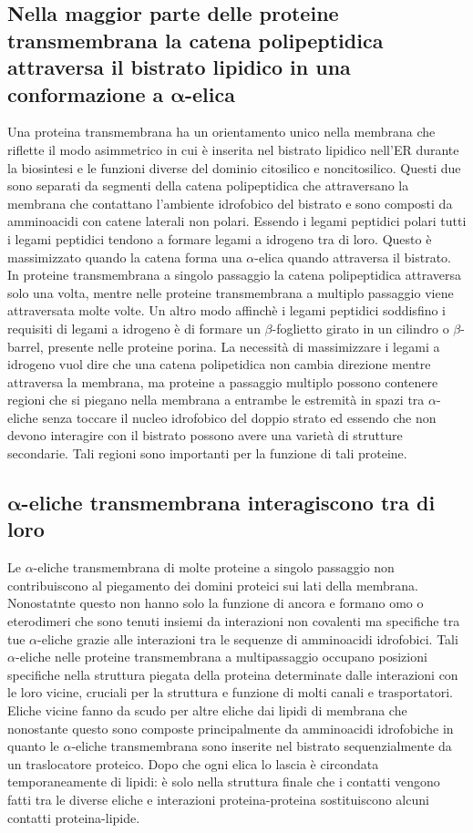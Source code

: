 \subsection{Nella maggior parte delle proteine transmembrana la catena polipeptidica attraversa il bistrato lipidico in una conformazione a $\mathbf{\alpha}$-elica}
Una proteina transmembrana ha un orientamento unico nella membrana che riflette il modo asimmetrico in cui \`e inserita nel bistrato lipidico nell'ER durante la biosintesi e le 
funzioni diverse del dominio citosilico e noncitosilico. Questi due sono separati da segmenti della catena polipeptidica che attraversano la membrana che contattano l'ambiente 
idrofobico del bistrato e sono composti da amminoacidi con catene laterali non polari. Essendo i legami peptidici polari tutti i legami peptidici tendono a formare legami a idrogeno tra
di loro. Questo \`e massimizzato quando la catena forma una $\alpha$-elica quando attraversa il bistrato. In proteine transmembrana a singolo passaggio la catena polipeptidica attraversa
solo una volta, mentre nelle proteine transmembrana a multiplo passaggio viene attraversata molte volte. Un altro modo affinch\`e i legami peptidici soddisfino i requisiti di 
legami a idrogeno \`e di formare un $\beta$-foglietto girato in un cilindro o $\beta$-barrel, presente nelle proteine porina. La necessit\`a di massimizzare i legami a idrogeno vuol dire
che una catena polipetidica non cambia direzione mentre attraversa la membrana, ma proteine a passaggio multiplo possono contenere regioni che si piegano nella membrana a entrambe le 
estremit\`a in spazi tra $\alpha$-eliche senza toccare il nucleo idrofobico del doppio strato ed essendo che non devono interagire con il bistrato possono avere una variet\`a di 
strutture secondarie. Tali regioni sono importanti per la funzione di tali proteine. 
\subsection{$\mathbf{\alpha}$-eliche transmembrana interagiscono tra di loro}
Le $\alpha$-eliche transmembrana di molte proteine a singolo passaggio non contribuiscono al piegamento dei domini proteici sui lati della membrana. Nonostatnte questo non hanno solo
la funzione di ancora e formano omo o eterodimeri che sono tenuti insiemi da interazioni non covalenti ma specifiche tra tue $\alpha$-eliche grazie alle interazioni tra le sequenze di
amminoacidi idrofobici. Tali $\alpha$-eliche nelle proteine transmembrana a multipassaggio occupano posizioni specifiche nella struttura piegata della proteina determinate dalle 
interazioni con le loro vicine, cruciali per la struttura e funzione di molti canali e trasportatori. Eliche vicine fanno da scudo per altre eliche dai lipidi di membrana che nonostante
questo sono composte principalmente da amminoacidi idrofobiche in quanto le $\alpha$-eliche transmembrana sono inserite nel bistrato sequenzialmente da un traslocatore proteico. Dopo
che ogni elica lo lascia \`e circondata temporaneamente di lipidi: \`e solo nella struttura finale che i contatti vengono fatti tra le diverse eliche e interazioni proteina-proteina
sostituiscono alcuni contatti proteina-lipide.
